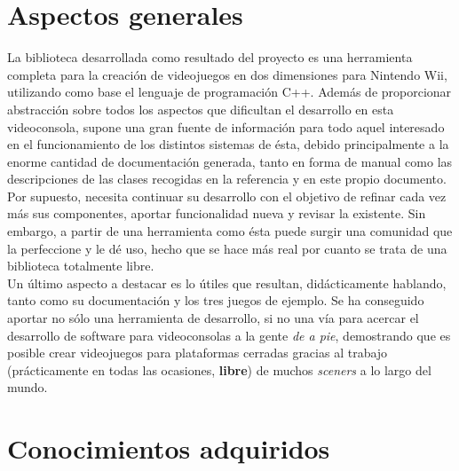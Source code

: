 



\section{Aspectos generales}

La biblioteca desarrollada como resultado del proyecto es una herramienta completa para la creación de videojuegos en dos dimensiones para Nintendo Wii, utilizando como base el lenguaje de programación C++. Además de proporcionar abstracción sobre todos los aspectos que dificultan el desarrollo en esta videoconsola, supone una gran fuente de información para todo aquel interesado en el funcionamiento de los distintos sistemas de ésta, debido principalmente a la enorme cantidad de documentación generada, tanto en forma de manual como las descripciones de las clases recogidas en la referencia y en este propio documento.\\

Por supuesto,  necesita continuar su desarrollo con el objetivo de refinar cada vez más sus componentes, aportar funcionalidad nueva y revisar la existente. Sin embargo, a partir de una herramienta como ésta puede surgir una comunidad que la perfeccione y le dé uso, hecho que se hace más real por cuanto se trata de una biblioteca totalmente libre.\\

Un último aspecto a destacar es lo útiles que resultan, didácticamente hablando, tanto  como su documentación y los tres juegos de ejemplo. Se ha conseguido aportar no sólo una herramienta de desarrollo, si no una vía para acercar el desarrollo de software para videoconsolas a la gente \emph{de a pie}, demostrando que es posible crear videojuegos para plataformas cerradas gracias al trabajo (prácticamente en todas las ocasiones, \textbf{libre}) de muchos \emph{sceners} a lo largo del mundo.

\section{Conocimientos adquiridos}

